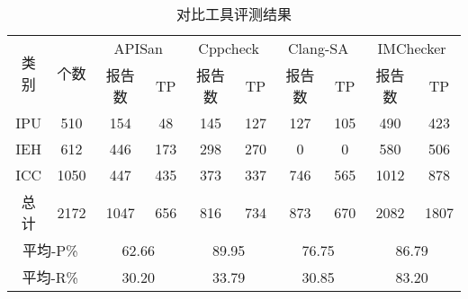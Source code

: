 \begin{table}[b]
	\centering
	\begin{minipage}[t]{0.9\linewidth} %
		\caption{对比工具评测结果}
		\label{tab:3-4-other}
		\begin{tabular}{cccccccccc}
			\hline
			\multirow{2}{*}{类别 } & \multirow{2}{*}{个数} & \multicolumn{2}{c}{APISan} & \multicolumn{2}{c}{Cppcheck} & \multicolumn{2}{c}{Clang-SA} & \multicolumn{2}{c}{IMChecker}\\
			\cline{3-10}
			 & & 报告数 & TP & 报告数 & TP& 报告数 & TP & 报告数 & TP \\
			 \hline
			 IPU & 510 &  154 & 48 & 145 &127 &127 &105 & 490 & 423\\
			 IEH & 612 &  446 &173& 298& 270& 0& 0& 580& 506 \\
			 ICC & 1050 &  447 &435 &373 &337 &746& 565 &1012 &878 \\
			 总计 & 2172 &   1047& 656& 816& 734& 873& 670& 2082& 1807 \\
			 \multicolumn{2}{c}{平均-P\%} &\multicolumn{2}{c}{62.66}  & \multicolumn{2}{c}{89.95}  &\multicolumn{2}{c}{76.75}  &\multicolumn{2}{c}{86.79} \\
			 \multicolumn{2}{c}{平均-R\%} & \multicolumn{2}{c}{30.20} & \multicolumn{2}{c}{33.79}  &\multicolumn{2}{c}{30.85}  &\multicolumn{2}{c}{83.20}  \\
			\hline
		\end{tabular}
	\end{minipage}
\end{table}